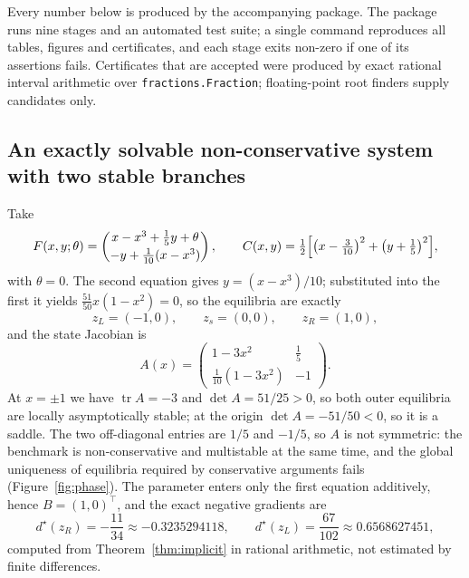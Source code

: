 \documentclass[11pt]{article}
\theoremstyle{definition}
\theoremstyle{remark}
\begin{document}
Every number below is produced by the accompanying package. The package runs nine stages and an
automated test suite; a single command reproduces all tables, figures and certificates, and each
stage exits non-zero if one of its assertions fails. Certificates that are accepted were produced
by exact rational interval arithmetic over \texttt{fractions.Fraction}; floating-point root
finders supply candidates only.

\subsection{An exactly solvable non-conservative system with two stable branches}
\label{sec:multistable}

Take
\begin{equation}
F(x,y;\theta) = \begin{pmatrix} x - x^3 + \tfrac15 y + \theta \\[2pt]
-y + \tfrac{1}{10}(x - x^3) \end{pmatrix},
\qquad
C(x,y) = \tfrac12\Bigl[\bigl(x-\tfrac{3}{10}\bigr)^2 + \bigl(y+\tfrac15\bigr)^2\Bigr],
\label{eq:model}
\end{equation}
with $\theta = 0$. The second equation gives $y = (x-x^3)/10$; substituted into the first it
yields $\frac{51}{50}x(1-x^2) = 0$, so the equilibria are exactly
\begin{equation}
z_L = (-1,0), \qquad z_s = (0,0), \qquad z_R = (1,0),
\end{equation}
and the state Jacobian is
\begin{equation}
A(x) = \begin{pmatrix} 1 - 3x^2 & \tfrac15 \\[2pt] \tfrac{1}{10}(1-3x^2) & -1 \end{pmatrix}.
\end{equation}
At $x = \pm 1$ we have $\operatorname{tr}A = -3$ and $\det A = 51/25 > 0$, so both outer
equilibria are locally asymptotically stable; at the origin $\det A = -51/50 < 0$, so it is a
saddle. The two off-diagonal entries are $1/5$ and $-1/5$, so $A$ is not symmetric: the benchmark
is non-conservative and multistable at the same time, and the global uniqueness of equilibria
required by conservative arguments fails (Figure~\ref{fig:phase}). The parameter enters only the
first equation additively, hence $B = (1,0)^{\top}$, and the exact negative gradients are
\begin{equation}
d^\star(z_R) = -\frac{11}{34} \approx -0.3235294118, \qquad
d^\star(z_L) = \frac{67}{102} \approx 0.6568627451 ,
\label{eq:exact-grads}
\end{equation}
computed from Theorem~\ref{thm:implicit} in rational arithmetic, not estimated by finite
differences.
\end{document}
